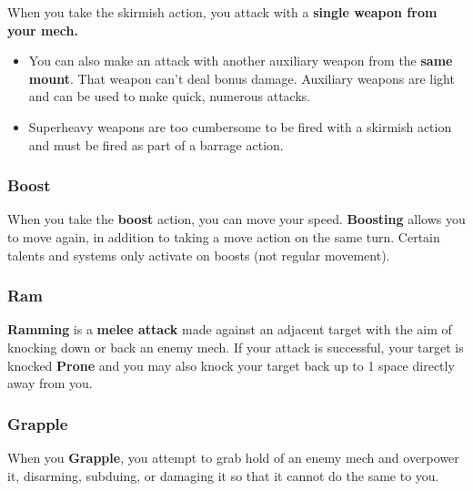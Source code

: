 When you take the skirmish action, you attack with a \textbf{single weapon from your mech.} 
\begin{itemize}
    \item You can also make an attack with another auxiliary weapon from the \textbf{same mount}. That weapon can’t deal bonus damage. Auxiliary weapons are light and can be used to make quick, numerous attacks.
    \item Superheavy weapons are too cumbersome to be fired with a skirmish action and must be fired as part of a barrage action.
\end{itemize}

\subsubsection{Boost}
When you take the \textbf{boost} action, you can move your speed. \textbf{Boosting} allows you to move again, in addition to taking a move action on the same turn. Certain talents and systems only activate on boosts (not regular movement).

\subsubsection{Ram}
\textbf{Ramming} is a \textbf{melee attack} made against an adjacent target with the aim of knocking down or back an enemy mech. 
If your attack is successful, your target is knocked \textbf{Prone} and you may also knock your target back up to 1 space directly away from you.

\subsubsection{Grapple}
When you \textbf{Grapple}, you attempt to grab hold of an enemy mech and overpower it, disarming, subduing, or damaging it so that it cannot do the same to you. 

